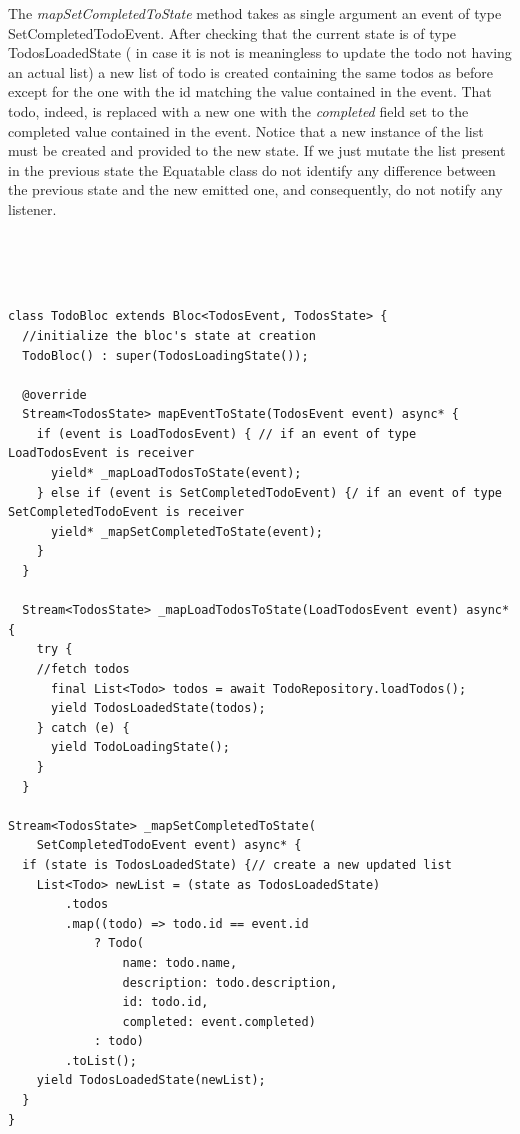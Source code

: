 The \textit{mapSetCompletedToState} method takes as single argument an event of type SetCompletedTodoEvent. After checking that the current state is of type TodosLoadedState ( in case it is not is meaningless to update the todo not having an actual list) a new list of todo is created containing the same todos as before except for the one with the id matching the value contained in the event. That todo, indeed, is replaced with a new one with the \textit{completed} field set to the completed value contained in the event. Notice that a new instance of the list must be created and provided to the new state. If we just mutate the list present in the previous state the Equatable class do not identify any difference between the previous state and the new emitted one, and consequently, do not notify any listener. 
\begin{code}
\mbox{}\\
 \mbox{}
\label{code:2.14}
\begin{verbatim}


class TodoBloc extends Bloc<TodosEvent, TodosState> {
  //initialize the bloc's state at creation
  TodoBloc() : super(TodosLoadingState());

  @override
  Stream<TodosState> mapEventToState(TodosEvent event) async* {
    if (event is LoadTodosEvent) { // if an event of type LoadTodosEvent is receiver
      yield* _mapLoadTodosToState(event);
    } else if (event is SetCompletedTodoEvent) {/ if an event of type SetCompletedTodoEvent is receiver
      yield* _mapSetCompletedToState(event);
    } 
  }

  Stream<TodosState> _mapLoadTodosToState(LoadTodosEvent event) async* {
    try {
    //fetch todos
      final List<Todo> todos = await TodoRepository.loadTodos();
      yield TodosLoadedState(todos);
    } catch (e) {
      yield TodoLoadingState();
    }
  }

Stream<TodosState> _mapSetCompletedToState(
    SetCompletedTodoEvent event) async* {
  if (state is TodosLoadedState) {// create a new updated list
    List<Todo> newList = (state as TodosLoadedState)
        .todos
        .map((todo) => todo.id == event.id
            ? Todo(
                name: todo.name,
                description: todo.description,
                id: todo.id,
                completed: event.completed)
            : todo)
        .toList();
    yield TodosLoadedState(newList);
  }
}


\end{verbatim}
\mbox{}
\end{code}
